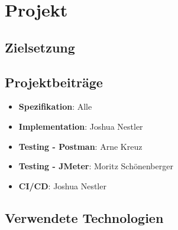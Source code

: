 \chapter{Projekt}

\section{Zielsetzung}


\section{Projektbeiträge}

\begin{itemize}
    \item \textbf{Spezifikation}: Alle
    \item \textbf{Implementation}: Joshua Nestler
    \item \textbf{Testing - Postman}: Arne Kreuz
    \item \textbf{Testing - JMeter}: Moritz Schönenberger
    \item \textbf{CI/CD}: Joshua Nestler
\end{itemize}

\section{Verwendete Technologien}

